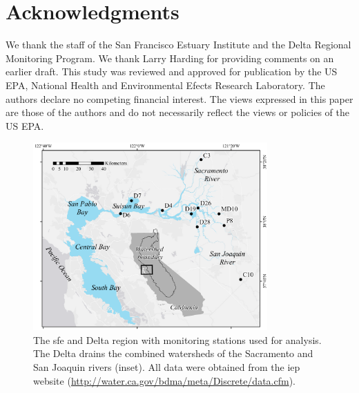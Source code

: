 \documentclass[journal = esthag, manuscript = article]{achemso}\usepackage[]{graphicx}\usepackage[]{color}
\begin{document}
\section*{Acknowledgments}

We thank the staff of the San Francisco Estuary Institute and the Delta Regional Monitoring Program. We thank Larry Harding for providing comments on an earlier draft. This study was reviewed and approved for publication by the US EPA, National Health and Environmental Efects Research Laboratory. The authors declare no competing financial interest. The views expressed in this paper are those of the authors and do not necessarily reflect the views or policies of the US EPA. 

\begin{singlespace}

\end{singlespace}
\clearpage


\begin{figure}
\centering
\includegraphics[width=0.8\textwidth,page=1]{figs/delt_map.pdf}
\caption{The \acl{sfe} and Delta region with monitoring stations used for analysis. The Delta drains the combined watersheds of the Sacramento and San Joaquin rivers (inset). All data were obtained from the \acl{iep} website (\url{http://water.ca.gov/bdma/meta/Discrete/data.cfm})\cite{IEP13}.}
\label{fig:delt_map}   
\end{figure}
\end{document}
